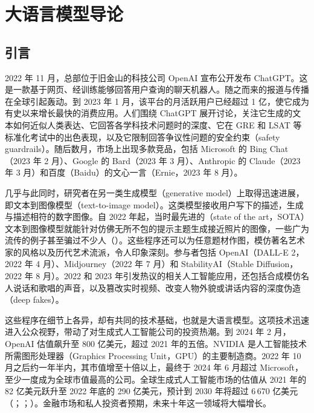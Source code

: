 \chapter{大语言模型导论}
\label{ch:intro}

\section{引言}
\label{sec:intro-opening}
2022 年 11 月，总部位于旧金山的科技公司 OpenAI 宣布公开发布 ChatGPT。这是一款基于网页、经训练能够回答用户查询的聊天机器人。随之而来的报道与传播在全球引起轰动。到 2023 年 1 月，该平台的月活跃用户已经超过 1 亿，使它成为有史以来增长最快的消费应用。人们围绕 ChatGPT 展开讨论，关注它生成的文本如何近似人类表达、它回答各学科技术问题时的深度、它在 GRE 和 LSAT 等标准化考试中的出色表现，以及它限制回答争议性问题的安全约束（safety guardrails）。随后数月，市场上出现多款竞品，包括 Microsoft 的 Bing Chat（2023 年 2 月）、Google 的 Bard（2023 年 3 月）、Anthropic 的 Claude（2023 年 3 月）和百度（Baidu）的文心一言（Ernie，2023 年 8 月）。

几乎与此同时，研究者在另一类生成模型（generative model）上取得迅速进展，即文本到图像模型（text-to-image model）。这类模型接收用户写下的描述，生成与描述相符的数字图像。自 2022 年起，当时最先进的（state of the art，SOTA）文本到图像模型就能针对仿佛无所不包的提示主题生成接近照片的图像，一些广为流传的例子甚至骗过不少人（）。这些程序还可以为任意题材作图，模仿著名艺术家的风格以及历代艺术流派，令人印象深刻。参与者包括 OpenAI（DALL-E 2，2022 年 4 月）、Midjourney（2022 年 7 月）和 StabilityAI（Stable Diffusion，2022 年 8 月）。2022 和 2023 年引发热议的相关人工智能应用，还包括合成模仿名人说话和歌唱的声音，以及篡改实时视频、改变人物外貌或讲话内容的深度伪造（deep fakes）。

这些程序在细节上各异，却有共同的技术基础，也就是大语言模型。这项技术迅速进入公众视野，带动了对生成式人工智能公司的投资热潮。到 2024 年 2 月，OpenAI 估值飙升至 800 亿美元，超过 2021 年的五倍。NVIDIA 是人工智能技术所需图形处理器（Graphics Processing Unit，GPU）的主要制造商。2022 年 10 月之后约一年半内，其市值增至十倍以上，最终于 2024 年 6 月超过 Microsoft，至少一度成为全球市值最高的公司。全球生成式人工智能市场的估值从 2021 年的 82 亿美元跃升至 2022 年底的 290 亿美元，预计到 2030 年将超过 6\,670 亿美元（；；）。金融市场和私人投资者预期，未来十年这一领域将大幅增长。

